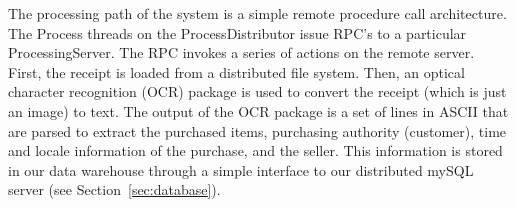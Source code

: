The processing path of the system is a simple remote procedure call
architecture. The Process threads on the ProcessDistributor issue
RPC's to a particular ProcessingServer. The RPC invokes a series of
actions on the remote server. First, the receipt is loaded from a
distributed file system. Then, an optical character recognition (OCR)
package is used to convert the receipt (which is just an image) to
text. The output of the OCR package is a set of lines in ASCII that
are parsed to extract the purchased items, purchasing authority
(customer), time and locale information of the purchase, and the
seller. This information is stored in our data warehouse through a
simple interface to our distributed mySQL server (see
Section~\ref{sec:database}).

